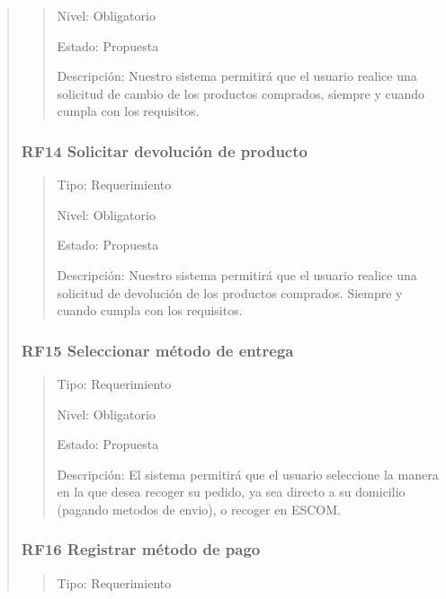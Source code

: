 \documentclass[14pt]{article}
\begin{document}
\begin{quote}
\begin{quote}
                        Nivel: Obligatorio
                        
                        Estado: Propuesta
                        
                        Descripción: Nuestro sistema permitirá que el usuario realice una solicitud de cambio de los productos comprados, siempre y cuando cumpla con los requisitos.
                    \end{quote}
                \subsubsection{RF14 Solicitar devolución de producto}\label{RF14 Solicitar devolución de producto}
                    \begin{quote}
                        Tipo: Requerimiento
                        
                        Nivel: Obligatorio
                        
                        Estado: Propuesta
                        
                        Descripción: Nuestro sistema permitirá que el usuario realice una solicitud de devolución de los productos comprados. Siempre y cuando cumpla con los requisitos.
                    \end{quote}
                \subsubsection{RF15 Seleccionar método de entrega}\label{RF15 Seleccionar método de entrega}
                    \begin{quote}
                        Tipo: Requerimiento
    
                        Nivel: Obligatorio
    
                        Estado: Propuesta
    
                        Descripción: El sistema permitirá que el usuario seleccione la manera en la que desea recoger su pedido, ya sea directo a su domicilio (pagando metodos de envio), o recoger en ESCOM.
                    \end{quote}
                \subsubsection{RF16 Registrar método de pago}\label{RF16 Registrar método de pago}
                    \begin{quote}
                        Tipo: Requerimiento
                        

\end{quote}
\end{quote}
\end{document}
